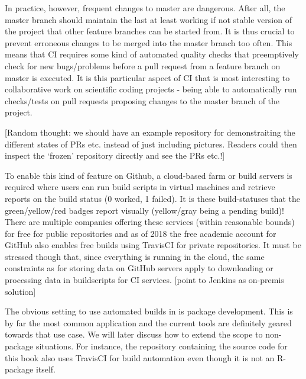 \documentclass[]{book}
\begin{document}
In practice, however, frequent changes to master are dangerous. After
all, the master branch should maintain the last at least working if not
stable version of the project that other feature branches can be started
from. It is thus crucial to prevent erroneous changes to be merged into
the master branch too often. This means that CI requires some kind of
automated quality checks that preemptively check for new bugs/problems
before a pull request from a feature branch on master is executed. It is
this particular aspect of CI that is most interesting to collaborative
work on scientific coding projects - being able to automatically run
checks/tests on pull requests proposing changes to the master branch of
the project.

{[}Random thought: we should have an example repository for
demonstraiting the different states of PRs etc. instead of just
including pictures. Readers could then inspect the `frozen' repository
directly and see the PRs etc.!{]}

To enable this kind of feature on Github, a cloud-based farm or build
servers is required where users can run build scripts in virtual
machines and retrieve reports on the build status (0 worked, 1 failed).
It is these build-statuses that the green/yellow/red badges report
visually (yellow/gray being a pending build)! There are multiple
companies offering these services (within reasonable bounds) for free
for public repositories and as of 2018 the free academic account for
GitHub also enables free builds using TravisCI for private repositories.
It must be stressed though that, since everything is running in the
cloud, the same constraints as for storing data on GitHub servers apply
to downloading or processing data in buildscripts for CI services.
{[}point to Jenkins as on-premis solution{]}

The obvious setting to use automated builds in is package development.
This is by far the most common application and the current tools are
definitely geared towards that use case. We will later discuss how to
extend the scope to non-package situations. For instance, the repository
containing the source code for this book also uses TravisCI for build
automation even though it is not an R-package itself.


\end{document}
